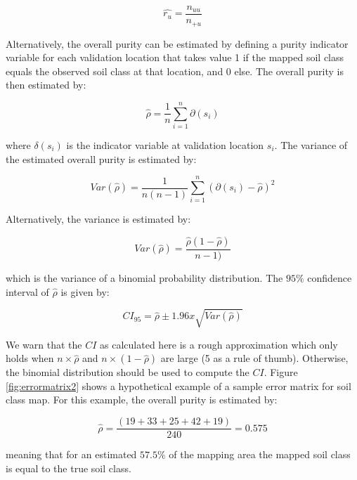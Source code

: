\documentclass[10pt,b5paper,]{book}
\theoremstyle{definition}
\theoremstyle{definition}
\theoremstyle{definition}
\theoremstyle{remark}
\begin{document}
\begin{equation}
\hat{r_u} = \frac{ n_{uu}}{n_{+u}}
\end{equation}

Alternatively, the overall purity can be estimated by defining a purity
indicator variable for each validation location that takes value 1 if
the mapped soil class equals the observed soil class at that location,
and 0 else. The overall purity is then estimated by:

\begin{equation}
\hat{\rho} = \frac{1}{n} \sum_{i=1}^{n} \partial(s_i)
\end{equation}

where \({\delta(s_i)}\) is the indicator variable at validation location
\(s_i\). The variance of the estimated overall purity is estimated by:

\begin{equation}
Var(\hat{\rho}) = \frac{1}{n(n-1)} \sum_{i=1}^{n} (\partial(s_i) - \hat{\rho})^2
\end{equation}

Alternatively, the variance is estimated by:

\begin{equation}
Var(\hat{\rho}) = \frac{\hat{\rho}(1 - \hat{\rho})}{n - 1)}
\end{equation}

which is the variance of a binomial probability distribution. The
\(95\%\) confidence interval of \(\hat{\rho}\) is given by:

\begin{equation}
CI_{95} = \hat{\rho} \pm 1.96x \sqrt{Var(\hat{\rho})}
\end{equation}

We warn that the \(CI\) as calculated here is a rough approximation
which only holds when \(n \times \hat{\rho}\) and
\(n \times (1 - \hat{\rho})\) are large (5 as a rule of thumb).
Otherwise, the binomial distribution should be used to compute the
\(CI\). Figure \ref{fig:errormatrix2} shows a hypothetical example of a
sample error matrix for soil class map. For this example, the overall
purity is estimated by:

\begin{equation}
\hat{\rho} = \frac{(19 + 33 + 25 + 42 + 19)}{240} = 0.575
\end{equation}

meaning that for an estimated \(57.5\%\) of the mapping area the mapped
soil class is equal to the true soil class.
\end{document}
